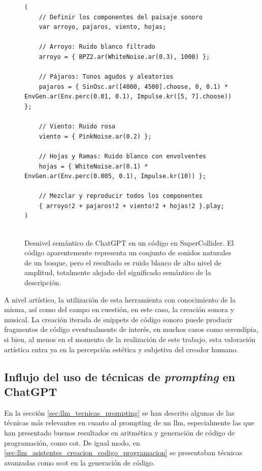 \begin{figure}[H]
    \caption[Desnivel semántico de ChatGPT en un código en SuperCollider]{Desnivel semántico de ChatGPT en un código en SuperCollider. El código aparentemente representa un conjunto de sonidos naturales de un bosque, pero el resultado es ruido blanco de alto nivel de amplitud, totalmente alejado del significado semántico de la descripción.}
    \centering
    \begin{lstlisting}[style=SuperCollider-IDE, basicstyle=\footnotesize\ttfamily, numbers=none]
(
    // Definir los componentes del paisaje sonoro
    var arroyo, pajaros, viento, hojas;
    
    // Arroyo: Ruido blanco filtrado
    arroyo = { BPZ2.ar(WhiteNoise.ar(0.3), 1000) };
    
    // Pájaros: Tonos agudos y aleatorios
    pajaros = { SinOsc.ar([4000, 4500].choose, 0, 0.1) * EnvGen.ar(Env.perc(0.01, 0.1), Impulse.kr([5, 7].choose)) };
    
    // Viento: Ruido rosa
    viento = { PinkNoise.ar(0.2) };
    
    // Hojas y Ramas: Ruido blanco con envolventes
    hojas = { WhiteNoise.ar(0.1) * EnvGen.ar(Env.perc(0.005, 0.1), Impulse.kr(10)) };
    
    // Mezclar y reproducir todos los componentes
    { arroyo!2 + pajaros!2 + viento!2 + hojas!2 }.play;
)
            
    \end{lstlisting}
    \label{fig:ChatGPT_desnivel_semantico}
\end{figure}

A nivel artístico, la utilización de esta herramienta con conocimiento de la misma, así como del campo en cuestión, en este caso, la creación sonora y musical. La creación iterada de snippets de código sonoro puede producir fragmentos de código eventualmente de interés, en muchos casos como serendipia, si bien, al menos en el momento de la realización de este trabajo, esta valoración artística entra ya en la percepción estética y subjetiva del creador humano.


\subsection{Influjo del uso de técnicas de \textit{prompting} en ChatGPT}

En la sección \ref{sec:llm_tecnicas_prompting} se han descrito algunas de las técnicas más relevantes en cuanto al prompting de un \gls{llm}, especialmente las que han presentado buenos resultados en aritmética y generación de código de programación, como \gls{cot}. De igual modo, en \ref{sec:llm_asistentes_creacion_codigo_programacion} se presentaban técnicas avanzadas como \gls{scot} en la generación de código.

